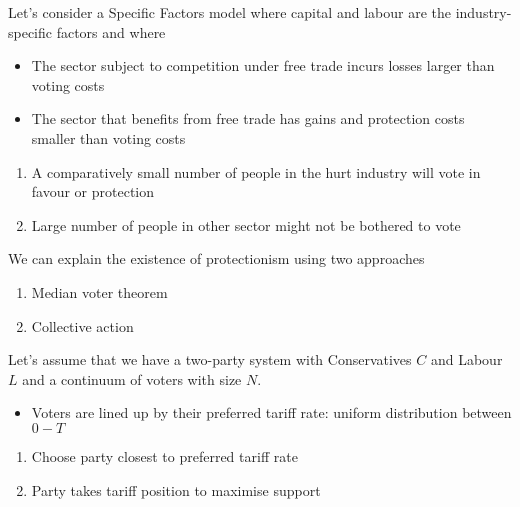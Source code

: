 \documentclass{beamer}
\begin{document}
\begin{frame}
Let's consider a Specific Factors model where capital and labour are the industry-specific factors and where
  \begin{itemize}
    \item The sector subject to competition under free trade incurs losses larger than voting costs
    \item The sector that benefits from free trade has gains and protection costs smaller than voting costs
  \end{itemize}
  \medskip
\begin{enumerate}
  \item A comparatively small number of people in the hurt industry will vote in favour or protection
  \item Large number of people in other sector might not be bothered to vote 
\end{enumerate}  
\end{frame}

\begin{frame}
  We can explain the existence of protectionism using two approaches
  \begin{enumerate}
    \item Median voter theorem
    \item Collective action
  \end{enumerate}
\end{frame}

\begin{frame}
  Let's assume that we have a two-party system with Conservatives $C$ and Labour $L$ and a continuum of voters with size $N$.
  \begin{itemize}
    \item Voters are lined up by their preferred tariff rate: uniform distribution between $0-T$
  \end{itemize}
  \medskip
  \begin{enumerate}
    \item Choose party closest to preferred tariff rate
    \item Party takes tariff position to maximise support
  \end{enumerate}
\end{frame}
\end{document}
